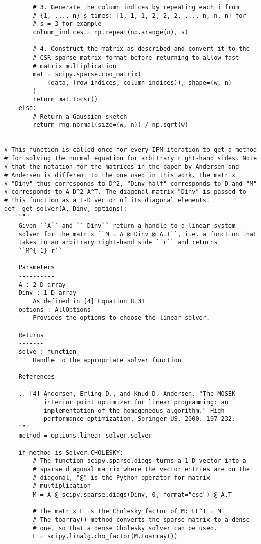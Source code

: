 \begin{verbatim}
        # 3. Generate the column indices by repeating each i from
        # {1, ..., n} s times: [1, 1, 1, 2, 2, 2, ..., n, n, n] for
        # s = 3 for example
        column_indices = np.repeat(np.arange(n), s)

        # 4. Construct the matrix as described and convert it to the
        # CSR sparse matrix format before returning to allow fast
        # matrix multiplication
        mat = scipy.sparse.coo_matrix(
            (data, (row_indices, column_indices)), shape=(w, n)
        )
        return mat.tocsr()
    else:
        # Return a Gaussian sketch
        return rng.normal(size=(w, n)) / np.sqrt(w)


# This function is called once for every IPM iteration to get a method
# for solving the normal equation for arbitrary right-hand sides. Note
# that the notation for the matrices in the paper by Andersen and
# Andersen is different to the one used in this work. The matrix
# "Dinv" thus corresponds to D^2, "Dinv_half" corresponds to D and "M"
# corresponds to A D^2 A^T. The diagonal matrix "Dinv" is passed to
# this function as a 1-D vector of its diagonal elements.
def _get_solver(A, Dinv, options):
    """
    Given ``A`` and `` Dinv`` return a handle to a linear system
    solver for the matrix ``M = A @ Dinv @ A.T``, i.e. a function that
    takes in an arbitrary right-hand side ``r`` and returns
    ``M^{-1} r``

    Parameters
    ----------
    A : 2-D array
    Dinv : 1-D array
        As defined in [4] Equation 8.31
    options : AllOptions
        Provides the options to choose the linear solver.

    Returns
    -------
    solve : function
        Handle to the appropriate solver function

    References
    ----------
    .. [4] Andersen, Erling D., and Knud D. Andersen. "The MOSEK
           interior point optimizer for linear programming: an
           implementation of the homogeneous algorithm." High
           performance optimization. Springer US, 2000. 197-232.
    """
    method = options.linear_solver.solver

    if method is Solver.CHOLESKY:
        # The function scipy.sparse.diags turns a 1-D vector into a
        # sparse diagonal matrix where the vector entries are on the
        # diagonal, "@" is the Python operator for matrix
        # multiplication
        M = A @ scipy.sparse.diags(Dinv, 0, format="csc") @ A.T

        # The matrix L is the Cholesky factor of M: LL^T = M
        # The toarray() method converts the sparse matrix to a dense
        # one, so that a dense Cholesky solver can be used.
        L = scipy.linalg.cho_factor(M.toarray())


\end{verbatim}
